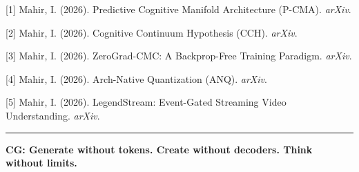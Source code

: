 \documentclass[
  11pt,
  a4paper,
]{article}
\begin{document}
{[}1{]} Mahir, I. (2026). Predictive Cognitive Manifold Architecture
(P-CMA). \emph{arXiv}.

{[}2{]} Mahir, I. (2026). Cognitive Continuum Hypothesis (CCH).
\emph{arXiv}.

{[}3{]} Mahir, I. (2026). ZeroGrad-CMC: A Backprop-Free Training
Paradigm. \emph{arXiv}.

{[}4{]} Mahir, I. (2026). Arch-Native Quantization (ANQ). \emph{arXiv}.

{[}5{]} Mahir, I. (2026). LegendStream: Event-Gated Streaming Video
Understanding. \emph{arXiv}.

\begin{center}\rule{0.5\linewidth}{0.5pt}\end{center}

\textbf{CG: Generate without tokens. Create without decoders. Think
without limits.}
\end{document}
